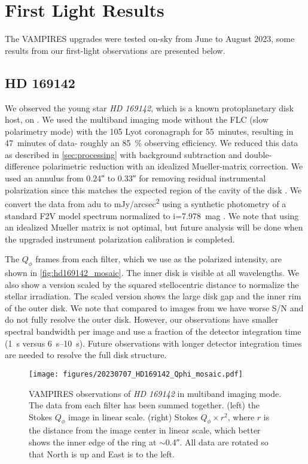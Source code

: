 \section{First Light Results}\label{sec:firstlight}

The VAMPIRES upgrades were tested on-sky from June to August 2023, some results from our first-light observations are presented below.

\subsection{HD 169142\label{sec:hd169142}}

We observed the young star \textit{HD 169142}, which is a known protoplanetary disk host, on . We used the multiband imaging mode without the FLC (slow polarimetry mode) with the \SI{105}{\mas} Lyot coronagraph for \SI{55}{minutes}, resulting in \SI{47}{minutes} of data- roughly an \SI{85}{\%} observing efficiency. We reduced this data as described in \autoref{sec:processing} with background subtraction and double-difference polarimetric reduction with an idealized Mueller-matrix correction. We used an annulus from \ang{;;0.24} to \ang{;;0.33} for removing residual instrumental polarization since this matches the expected region of the cavity of the disk \citep{bertrang_hd_2018}. We convert the data from \si{adu} to \si{mJy/arcsec^2} using a synthetic photometry of a standard F2V model spectrum \citep{pickles_stellar_1998} normalized to i=\SI{7.978}{mag} \citep{zacharias_fourth_2013}. We note that using an idealized Mueller matrix is not optimal, but future analysis will be done when the upgraded instrument polarization calibration is completed.

The $Q_\phi$ frames from each filter, which we use as the polarized intensity, are shown in \autoref{fig:hd169142_mosaic}. The inner disk is visible at all wavelengths. We also show a version scaled by the squared stellocentric distance to normalize the stellar irradiation. The scaled version shows the large disk gap and the inner rim of the outer disk. We note that compared to images from \cite{bertrang_hd_2018} we have worse S/N and do not fully resolve the outer disk. However, our observations have smaller spectral bandwidth per image and use a fraction of the detector integration time (\SI{1}{s} versus \SIrange{6}{10}{s}). Future observations with longer detector integration times are needed to resolve the full disk structure.

\begin{figure}
    \centering
    \texttt{[image: figures/20230707\_HD169142\_Qphi\_mosaic.pdf]}
    \caption{ VAMPIRES observations of \textit{HD 169142} in multiband imaging mode. The data from each filter has been summed together. (left) the Stokes $Q_\phi$ image in linear scale. (right) Stokes $Q_\phi\times r^2$, where $r$ is the distance from the image center in linear scale, which better shows the inner edge of the ring at $\sim$\ang{;;0.4}. All data are rotated so that North is up and East is to the left.\label{fig:hd169142_mosaic}}
\end{figure}

